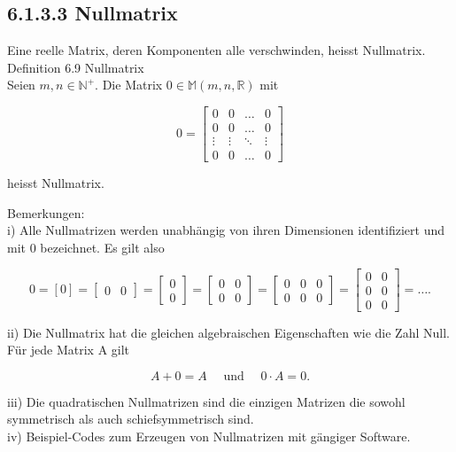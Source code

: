 \documentclass[10pt]{article}
\begin{document}
\subsection*{6.1.3.3 Nullmatrix}
Eine reelle Matrix, deren Komponenten alle verschwinden, heisst Nullmatrix.\\
Definition 6.9 Nullmatrix\\
Seien $m, n \in \mathbb{N}^{+}$. Die Matrix $0 \in \mathbb{M}(m, n, \mathbb{R})$ mit

\[
0=\left[\begin{array}{cccc}
0 & 0 & \ldots & 0  \tag{6.17}\\
0 & 0 & \ldots & 0 \\
\vdots & \vdots & \ddots & \vdots \\
0 & 0 & \ldots & 0
\end{array}\right]
\]

heisst Nullmatrix.

Bemerkungen:\\
i) Alle Nullmatrizen werden unabhängig von ihren Dimensionen identifiziert und mit 0 bezeichnet. Es gilt also

\[
0=[0]=\left[\begin{array}{ll}
0 & 0
\end{array}\right]=\left[\begin{array}{l}
0  \tag{6.18}\\
0
\end{array}\right]=\left[\begin{array}{ll}
0 & 0 \\
0 & 0
\end{array}\right]=\left[\begin{array}{lll}
0 & 0 & 0 \\
0 & 0 & 0
\end{array}\right]=\left[\begin{array}{ll}
0 & 0 \\
0 & 0 \\
0 & 0
\end{array}\right]=\ldots .
\]

ii) Die Nullmatrix hat die gleichen algebraischen Eigenschaften wie die Zahl Null. Für jede Matrix A gilt


\begin{equation*}
A+0=A \quad \text { und } \quad 0 \cdot A=0 . \tag{6.19}
\end{equation*}


iii) Die quadratischen Nullmatrizen sind die einzigen Matrizen die sowohl symmetrisch als auch schiefsymmetrisch sind.\\
iv) Beispiel-Codes zum Erzeugen von Nullmatrizen mit gängiger Software.
\end{document}
